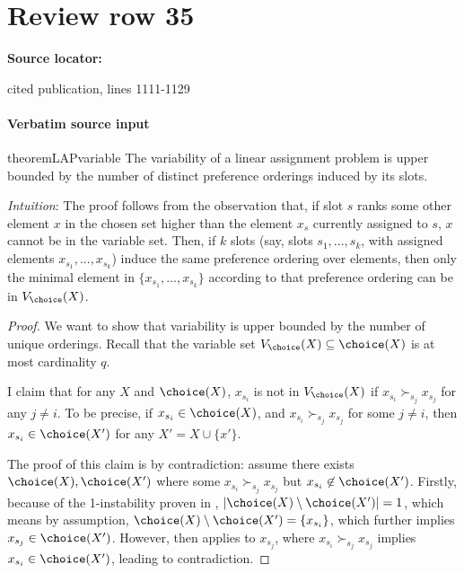 \documentclass[10pt]{article}
\begin{document}
\section*{Review row 35}
\textbf{Source locator:} {\footnotesize\raggedright cited publication, lines 1111-\allowbreak{}1129\par}
\paragraph{Verbatim source input}
\begin{ReviewVerbatim}
\begin{restatable}{theorem}{LAPvariable}
\label{thm:lap-variability}
The variability of a linear assignment problem is upper bounded by the number of distinct preference orderings induced by its slots.
\end{restatable}

\textit{Intuition}:
The proof follows from the observation that, if slot $s$ ranks some other element $x$ in the chosen set higher than the element $x_s$ currently assigned to $s$, $x$ cannot be in the variable set. Then, if $k$ slots (say, slots $s_1, ..., s_k$, with assigned elements $x_{s_1}, ..., x_{s_k}$) induce the same preference ordering over elements, then only the minimal element in $\{x_{s_1}, ..., x_{s_k}\}$ according to that preference ordering can be in $V_\choice(X)$.

\begin{proof}
We want to show that variability is upper bounded by the number of unique orderings. Recall that the variable set $V_\choice(X) \subseteq \choice(X)$ is at most cardinality $q$.

I claim that for any $X$ and $\choice(X)$, $x_{s_i}$ is not in $V_\choice(X)$ if $x_{s_i} \succ_{s_j} x_{s_j}$ for any $j \neq i$.
To be precise, if $x_{s_i} \in \choice(X)$, and $x_{s_i} \succ_{s_j} x_{s_j}$ for some $j \neq i$, then $x_{s_i} \in \choice(X')$ for any $X' = X \cup \{x'\}$.

The proof of this claim is by contradiction: assume there exists $\choice(X), \choice(X')$ where some $x_{s_i} \succ_{s_j} x_{s_j}$ but $x_{s_i} \not\in \choice(X')$. Firstly, because of the 1-instability proven in , $|\choice(X) \setminus \choice(X')| = 1$, which means by assumption, $\choice(X) \setminus \choice(X') = \{x_{s_i}\}$, which further implies $x_{s_j} \in \choice(X')$. However,   then applies to $x_{s_j}$, where $x_{s_i} \succ_{s_j} x_{s_j}$ implies $x_{s_i} \in \choice(X')$, leading to contradiction.


\end{proof}
\end{ReviewVerbatim}
\end{document}
